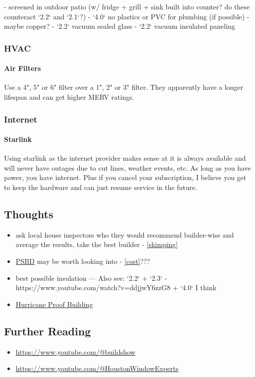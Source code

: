 \documentclass{article}
\begin{document}
- screened in outdoor patio (w/ fridge + grill + sink built into counter? do these counteract `2.2` and `2.1`?)
- `4.0` no plastics or PVC for plumbing (if possible)
    - maybe copper?
- `2.2` vacuum sealed glass
- `2.2` vacuum insulated paneling

\subsubsection{HVAC}
\paragraph{Air Filters} Use a 4", 5" or 6" filter over a 1", 2" or 3" filter. They apparently have a longer lifespan and can get higher MERV ratings.

\subsubsection{Internet}
\paragraph{Starlink}
Using starlink as the internet provider makes sense at it is always available and will never have outages due to cut lines, weather events, etc. As long as you have power, you have internet. Plus if you cancel your subscription, I believe you get to keep the hardware and can just resume service in the future.

\subsection{Thoughts}
\begin{itemize}
    \item ask local house inspectors who they would recommend builder-wise and average the results, take the best builder - \ref{skimping}
    \item \href{https://en.wikipedia.org/wiki/Passive_solar_building_design}{PSBD} may be worth looking into - \ref{cost}???
    \item best possible insulation --- Also see: `2.2` + `2.3` - https://www.youtube.com/watch?v=ddjjwY6zzG8 + `4.0` I think
    \item \href{https://en.wikipedia.org/wiki/Hurricane-proof_building}{Hurricane Proof Building}
\end{itemize}

\subsection{Further Reading}
\begin{itemize}
    \item \url{https://www.youtube.com/@buildshow}
    \item \url{https://www.youtube.com/@HoustonWindowExperts}
\end{itemize}
\end{document}
